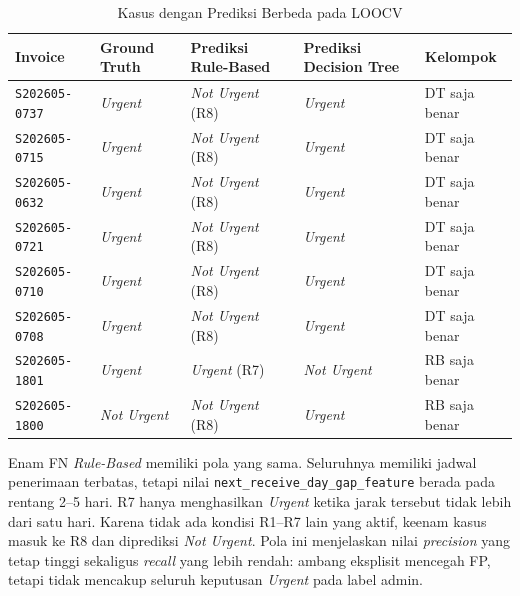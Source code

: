 \begin{table}[htbp]
    \centering
    \caption{Kasus dengan Prediksi Berbeda pada LOOCV}
    \label{tab:kasus-kesalahan-loocv}
    \scriptsize
    \renewcommand{\arraystretch}{1.15}
    \begin{tabularx}{\textwidth}{p{}p{}p{}p{}X}
        \toprule
        \textbf{Invoice} & \textbf{Ground Truth} & \textbf{Prediksi Rule-Based} & \textbf{Prediksi Decision Tree} & \textbf{Kelompok} \\
        \midrule
        \texttt{S202605-0737} & \textit{Urgent} & \textit{Not Urgent} (R8) & \textit{Urgent} & DT saja benar \\
        \texttt{S202605-0715} & \textit{Urgent} & \textit{Not Urgent} (R8) & \textit{Urgent} & DT saja benar \\
        \texttt{S202605-0632} & \textit{Urgent} & \textit{Not Urgent} (R8) & \textit{Urgent} & DT saja benar \\
        \texttt{S202605-0721} & \textit{Urgent} & \textit{Not Urgent} (R8) & \textit{Urgent} & DT saja benar \\
        \texttt{S202605-0710} & \textit{Urgent} & \textit{Not Urgent} (R8) & \textit{Urgent} & DT saja benar \\
        \texttt{S202605-0708} & \textit{Urgent} & \textit{Not Urgent} (R8) & \textit{Urgent} & DT saja benar \\
        \texttt{S202605-1801} & \textit{Urgent} & \textit{Urgent} (R7) & \textit{Not Urgent} & RB saja benar \\
        \texttt{S202605-1800} & \textit{Not Urgent} & \textit{Not Urgent} (R8) & \textit{Urgent} & RB saja benar \\
        \bottomrule
    \end{tabularx}
\end{table}

Enam FN \textit{Rule-Based} memiliki pola yang sama. Seluruhnya memiliki jadwal penerimaan terbatas, tetapi nilai \texttt{next\_receive\_day\_gap\_feature} berada pada rentang 2--5 hari. R7 hanya menghasilkan \textit{Urgent} ketika jarak tersebut tidak lebih dari satu hari. Karena tidak ada kondisi R1--R7 lain yang aktif, keenam kasus masuk ke R8 dan diprediksi \textit{Not Urgent}. Pola ini menjelaskan nilai \textit{precision} yang tetap tinggi sekaligus \textit{recall} yang lebih rendah: ambang eksplisit mencegah FP, tetapi tidak mencakup seluruh keputusan \textit{Urgent} pada label admin.

